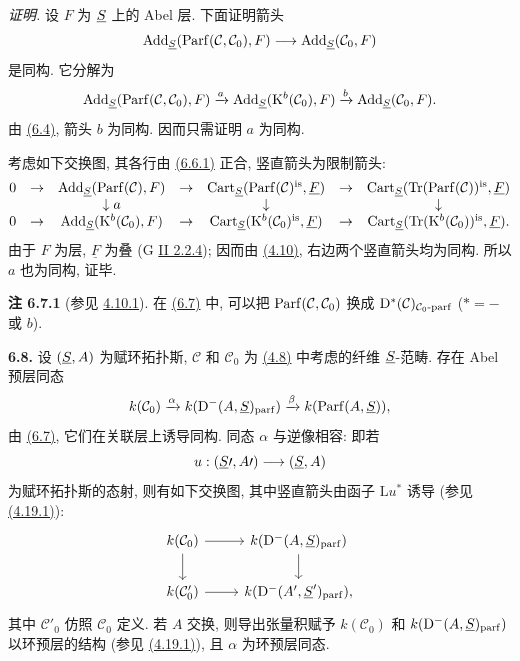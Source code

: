\emph{证明.} 设 \(F\) 为 \(\underline S\) 上的 Abel 层. 下面证明箭头
\[
  \operatorname{Add}_{\underline S}(\operatorname{Parf}(\mathcal C,\mathcal C_0),F)
  \longrightarrow
  \operatorname{Add}_{\underline S}(\mathcal C_0,F)
\]
是同构. 它分解为
\[
\operatorname{Add}_{\underline S}(\operatorname{Parf}(\mathcal C,\mathcal C_0),F)
 \xrightarrow{a}
\operatorname{Add}_{\underline S}(\mathrm K^b(\mathcal C_0),F)
 \xrightarrow{b}
\operatorname{Add}_{\underline S}(\mathcal C_0,F).
\]
由 \hyperlink{sga6.e01.lem.6-4}{(6.4)}, 箭头 \(b\) 为同构. 因而只需证明 \(a\) 为同构.

考虑如下交换图, 其各行由 \hyperlink{sga6.e01.eq.6-6-1}{(6.6.1)} 正合, 竖直箭头为限制箭头:
\[
\begin{array}{@{}ccccccc@{}}
0&\to&\Add_{\sgaIS}(\Parf(\mathcal C),F)&\to&\Cart_{\sgaIS}(\Parf(\mathcal C)^{\is},\underline F)&\to&\Cart_{\sgaIS}(\Tr(\Parf(\mathcal C))^{\is},\underline F)\\
&&\downarrow a&&\downarrow&&\downarrow\\
0&\to&\Add_{\sgaIS}(\Kpx^b(\mathcal C_0),F)&\to&\Cart_{\sgaIS}(\Kpx^b(\mathcal C_0)^{\is},\underline F)&\to&\Cart_{\sgaIS}(\Tr(\Kpx^b(\mathcal C_0))^{\is},\underline F).
\end{array}
\]
由于 \(F\) 为层, \(\underline F\) 为叠 (G \hyperlink{sga6.e02.def.2-2-4}{II 2.2.4}); 因而由 \hyperlink{sga6.e01.prop.4-10}{(4.10)}, 右边两个竖直箭头均为同构. 所以 \(a\) 也为同构, 证毕.

\textbf{注 6.7.1} (参见 \hyperlink{sga6.e01.rem.4-10-1}{4.10.1}). 在 \hyperlink{sga6.e01.prop.6-7}{(6.7)} 中, 可以把 \(\operatorname{Parf}(\mathcal C,\mathcal C_0)\) 换成 \(\mathrm D^*(\mathcal C)_{\mathcal C_0\text{-}\mathrm{parf}}\) (\(*=-\) 或 \(b\)).

\textbf{6.8.} 设 \((\underline S,A)\) 为赋环拓扑斯, \(\mathcal C\) 和 \(\mathcal C_0\) 为 \hyperlink{sga6.e01.ex.4-8}{(4.8)} 中考虑的纤维 \(\underline S\)-范畴. 存在 Abel 预层同态
\[
  k(\mathcal C_0)
  \xrightarrow{\alpha}
  k(\mathrm D^-(A,\underline S)_{\mathrm{parf}})
  \xrightarrow{\beta}
  k(\operatorname{Parf}(A,\underline S)),
\]
由 \hyperlink{sga6.e01.prop.6-7}{(6.7)}, 它们在关联层上诱导同构. 同态 \(\alpha\) 与逆像相容: 即若
\[
  u:(\underline S\prime,A\prime)\longrightarrow(\underline S,A)
\]
为赋环拓扑斯的态射, 则有如下交换图, 其中竖直箭头由函子 \(\mathrm L u^*\) 诱导 (参见 \hyperlink{sga6.e01.cor.4-19-1}{(4.19.1)}):
\[
\begin{tikzcd}
 k(\mathcal C_0) \arrow[r] \arrow[d] & k(\Dpx^-(A,\sgaIS)_{\mathrm{parf}}) \arrow[d]\\
 k(\mathcal C'_0) \arrow[r] & k(\Dpx^-(A',\sgaIS')_{\mathrm{parf}}),
\end{tikzcd}
\]
其中 \(\mathcal C'_0\) 仿照 \(\mathcal C_0\) 定义. 若 \(A\) 交换, 则导出张量积赋予 \(k(\mathcal C_0)\) 和 \(k(\mathrm D^-(A,\underline S)_{\mathrm{parf}})\) 以环预层的结构 (参见 \hyperlink{sga6.e01.cor.4-19-1}{(4.19.1)}), 且 \(\alpha\) 为环预层同态.

